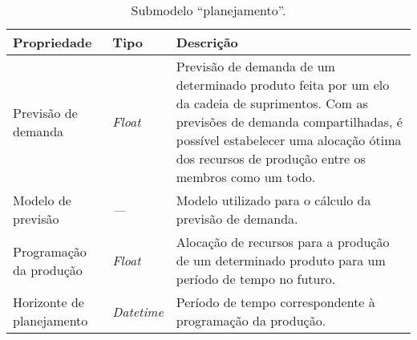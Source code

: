 \begin{table}[htb]
	\centering
	\caption{Submodelo ``planejamento''.}
	\begin{tabular}{p{3.5cm}p{1.5cm}p{9cm}}
		\hline
		\textbf{Propriedade}
		 & \textbf{Tipo}
		 & \textbf{Descrição}                                                                                                                                                                                                                     \\

		\hline
		Previsão de demanda
		 & \textit{Float}
		 & Previsão de demanda de um determinado produto feita por um elo da cadeia de suprimentos. Com as previsões de demanda compartilhadas, é possível estabelecer uma alocação ótima dos recursos de produção entre os membros como um todo. \\

		\hline
		Modelo de previsão
		 & \textit{---}
		 & Modelo utilizado para o cálculo da previsão de demanda.                                                                                                                                                                                \\


		\hline
		Programação da produção
		 & \textit{Float}
		 & Alocação de recursos para a produção de um determinado produto para um período de tempo no futuro.                                                                                                                                     \\


		\hline
		Horizonte de planejamento
		 & \textit{Datetime}
		 & Período de tempo correspondente à programação da produção.                                                                                                                                                                             \\

		\hline
	\end{tabular}
	\label{tab:produto-submodelo-planejamento}
\end{table}
